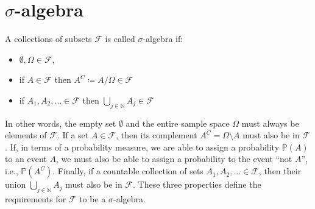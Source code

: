 \section{$\sigma$-algebra}
A collections of subsets $\mathcal{F}$ is called $\sigma$-algebra if:
\begin{itemize}
	\item $\emptyset, \Omega \in \mathcal{F} $,
	\item if $A \in \mathcal{F} $ then $A^C \coloneqq A / \Omega \in \mathcal{F}$
	\item if $A_1 , A_2, \dots  \in \mathcal{F} $ then $ \bigcup_{j \in \mathbb{N}}  A_j \in  \mathcal{F}$
\end{itemize}
In other words, the empty set $\emptyset$ and the entire sample space $\Omega$ must always be elements of $\mathcal{F}$. If a set $A \in \mathcal{F}$, then its complement $A^C = \Omega \setminus A$ must also be in $\mathcal{F}$. 
If, in terms of a probability measure, we are able to assign a probability $\mathbb{P}(A)$ to an event $A$, we must also be able to assign a probability to the event “not $A$”, i.e., $\mathbb{P}(A^C)$.
Finally, if a countable collection of sets $A_1, A_2, \dots \in \mathcal{F}$, then their union $\bigcup_{j \in \mathbb{N}} A_j$ must also be in $\mathcal{F}$. These three properties define the requirements for $\mathcal{F}$ to be a $\sigma$-algebra.
